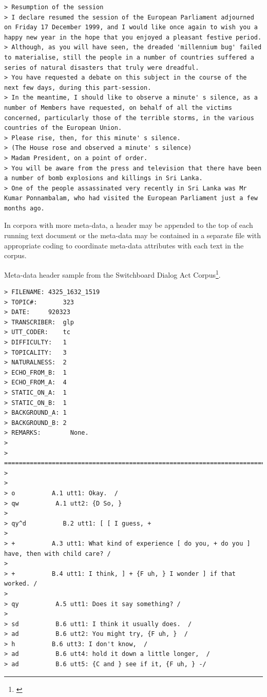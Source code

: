 \documentclass[
]{article}
\DeclareRobustCommand{\href}[2]{#2\footnote{\url{#1}}}
\begin{document}
\begin{verbatim}
> Resumption of the session
> I declare resumed the session of the European Parliament adjourned on Friday 17 December 1999, and I would like once again to wish you a happy new year in the hope that you enjoyed a pleasant festive period.
> Although, as you will have seen, the dreaded 'millennium bug' failed to materialise, still the people in a number of countries suffered a series of natural disasters that truly were dreadful.
> You have requested a debate on this subject in the course of the next few days, during this part-session.
> In the meantime, I should like to observe a minute' s silence, as a number of Members have requested, on behalf of all the victims concerned, particularly those of the terrible storms, in the various countries of the European Union.
> Please rise, then, for this minute' s silence.
> (The House rose and observed a minute' s silence)
> Madam President, on a point of order.
> You will be aware from the press and television that there have been a number of bomb explosions and killings in Sri Lanka.
> One of the people assassinated very recently in Sri Lanka was Mr Kumar Ponnambalam, who had visited the European Parliament just a few months ago.
\end{verbatim}

In corpora with more meta-data, a header may be appended to the top of each running text document or the meta-data may be contained in a separate file with appropriate coding to coordinate meta-data attributes with each text in the corpus.

Meta-data header sample from the \href{}{Switchboard Dialog Act Corpus}.

\begin{verbatim}
> FILENAME: 4325_1632_1519
> TOPIC#:       323
> DATE:     920323
> TRANSCRIBER:  glp
> UTT_CODER:    tc
> DIFFICULTY:   1
> TOPICALITY:   3
> NATURALNESS:  2
> ECHO_FROM_B:  1
> ECHO_FROM_A:  4
> STATIC_ON_A:  1
> STATIC_ON_B:  1
> BACKGROUND_A: 1
> BACKGROUND_B: 2
> REMARKS:        None.
> 
> =========================================================================
> 
> 
> o          A.1 utt1: Okay.  /
> qw          A.1 utt2: {D So, }
> 
> qy^d          B.2 utt1: [ [ I guess, +
> 
> +          A.3 utt1: What kind of experience [ do you, + do you ] have, then with child care? /
> 
> +          B.4 utt1: I think, ] + {F uh, } I wonder ] if that worked. /
> 
> qy          A.5 utt1: Does it say something? /
> 
> sd          B.6 utt1: I think it usually does.  /
> ad          B.6 utt2: You might try, {F uh, }  /
> h          B.6 utt3: I don't know,  /
> ad          B.6 utt4: hold it down a little longer,  /
> ad          B.6 utt5: {C and } see if it, {F uh, } -/
\end{verbatim}
\end{document}
